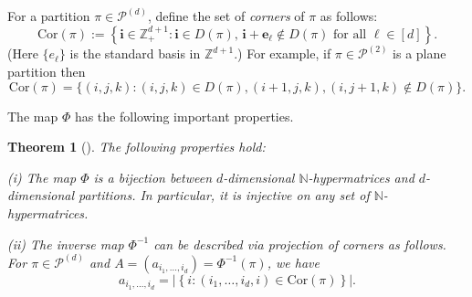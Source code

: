 \documentclass[12pt]{amsart}
\newtheorem{theorem}{Theorem}[section]
\theoremstyle{definition}
\theoremstyle{remark}
\begin{document}
\vspace{0.5em}


For a partition $\pi \in \mathcal{P}^{(d)}$, define the set of {\it corners} of $\pi$ as follows:
$$
\mathrm{Cor}(\pi) := \left\{\mathbf{i} \in \mathbb{Z}^{d+1}_+ : \mathbf{i} \in D(\pi),\, \mathbf{i} + \mathbf{e}_{\ell} \not\in D(\pi) \text{ for all } \ell \in [d] \right\}.
$$
(Here $\{e_{\ell}\}$ is the standard basis in $\mathbb{Z}^{d+1}$.) For example, if $\pi \in \mathcal{P}^{(2)}$ is a plane partition then $$\mathrm{Cor}(\pi) = \{(i,j,k) : (i,j, k) \in D(\pi), (i+1, j, k), (i, j+1, k) \not\in D(\pi) \}.$$ %


\vspace{0.5em}

The map $\Phi$ has the following important properties.

\begin{theorem}[\cite{ay}] The following properties hold:

(i) The map $\Phi$  is a bijection between $d$-dimensional $\mathbb{N}$-hypermatrices and $d$-dimensional partitions. In particular, it is injective on any set of $\mathbb{N}$-hypermatrices. 

(ii) The inverse map $\Phi^{-1}$ can be described via projection of corners as follows. For $\pi \in \mathcal{P}^{(d)}$ and $A = (a_{i_1,\ldots, i_d}) = \Phi^{-1}(\pi)$, we have 
$$
a_{i_1,\ldots, i_d} = \left| \left\{i : (i_1,\ldots, i_d, i) \in \mathrm{Cor}(\pi) \right\} \right|.
$$
\end{theorem}
\end{document}
